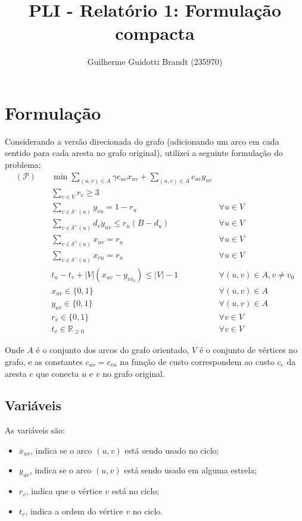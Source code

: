 \documentclass{article}
\title{PLI - Relatório 1: Formulação compacta}
\author{Guilherme Guidotti Brandt (235970)}
\date{}
\begin{document}
\maketitle

\section{Formulação}

Considerando a versão direcionada do grafo (adicionando um arco em cada sentido para cada aresta no grafo original), utilizei a seguinte formulação do problema:
\begin{align}
    (\mathcal{P})\quad
    &\min \sum_{(u, v) \in A} \gamma c_{uv} x_{uv} + \sum_{(u, v) \in A} c_{uv} y_{uv}\nonumber\\
    &\sum_{v \in V} r_{v} \geq 3                            \label{min-partitions}\\
    &\sum_{v \in \delta^-(u)} y_{vu} = 1 - r_u              &\forall u \in V\label{star-in-degree}\\
    &\sum_{v \in \delta^+(u)} d_v y_{uv} \leq r_u (B - d_u) &\forall u \in V\label{partition-packing}\\
    &\sum_{v \in \delta^+(u)} x_{uv} = r_u                  &\forall u \in V\label{circuit-out-degree}\\
    &\sum_{v \in \delta^-(u)} x_{vu} = r_u                  &\forall u \in V\label{circuit-in-degree}\\
    &t_u - t_v + |V|(x_{uv} - y_{vv_0}) \leq |V| - 1&\forall (u, v) \in A, v \neq v_0\label{circuit-order}\\
    &x_{uv} \in \{0, 1\}&\forall (u, v) \in A\nonumber\\
    &y_{uv} \in \{0, 1\}&\forall (u, v) \in A\nonumber\\
    &r_{v} \in \{0, 1\}&\forall v \in V\nonumber\\
    &t_{v} \in \mathbb{R}_{\geq 0}&\forall v \in V\nonumber
\end{align}

Onde $A$ é o conjunto dos arcos do grafo orientado, $V$ é o conjunto de vértices no grafo, e as constantes $c_{uv} = c_{vu}$ na função de custo correspondem ao custo $c_e$ da aresta $e$ que conecta $u$ e $v$ no grafo original.

\subsection{Variáveis}

As variáveis são:
\begin{itemize}
    \item $x_{uv}$, indica se o arco $(u, v)$ está sendo usado no ciclo;
    \item $y_{uv}$, indica se o arco $(u, v)$ está sendo usado em alguma estrela;
    \item $r_v$, indica que o vértice $v$ está no ciclo;
    \item $t_v$, indica a ordem do vértice $v$ no ciclo.
\end{itemize}
\end{document}

